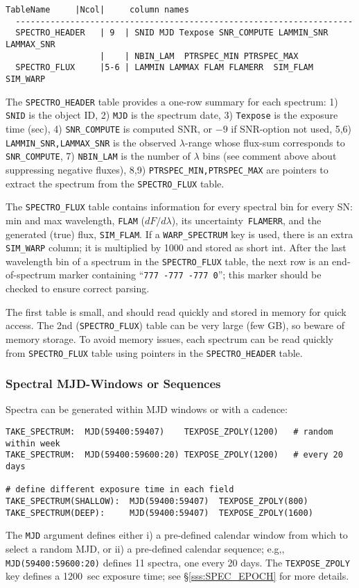\documentclass[12pt]{article}
\newcommand{\unc}{uncertainty}
\newcommand{\Flam}{dF/d\lambda}
\begin{document}
\begin{Verbatim}[frame=single]
     TableName     |Ncol|     column names 
  --------------------------------------------------------------------
  SPECTRO_HEADER   | 9  | SNID MJD Texpose SNR_COMPUTE LAMMIN_SNR LAMMAX_SNR
                   |    | NBIN_LAM  PTRSPEC_MIN PTRSPEC_MAX
  SPECTRO_FLUX     |5-6 | LAMMIN LAMMAX FLAM FLAMERR  SIM_FLAM  SIM_WARP
\end{Verbatim}
%
The {\tt SPECTRO\_HEADER} table provides a one-row summary for 
each spectrum:
1) {\tt SNID} is the object ID, 
2) {\tt MJD} is the spectrum date, 
3) {\tt Texpose}  is the exposure time (sec), 
4) {\tt SNR\_COMPUTE} is computed SNR, or $-9$ if SNR-option not used,
5,6) {\tt LAMMIN\_SNR,LAMMAX\_SNR} is the observed $\lambda$-range
  whose flux-sum corresponds to {\tt SNR\_COMPUTE},
7) {\tt NBIN\_LAM} is the number of $\lambda$ bins
(see comment above about suppressing negative fluxes), 
8,9) {\tt PTRSPEC\_MIN,PTRSPEC\_MAX} are  pointers to extract the 
spectrum from the {\tt SPECTRO\_FLUX} table.

The {\tt SPECTRO\_FLUX} table contains information for every spectral 
bin for every SN: 
min and max wavelength,
{\tt FLAM} ($\Flam$), 
its \unc\ {\tt FLAMERR}, 
and the generated (true) flux, {\tt SIM\_FLAM}.
If a {\tt WARP\_SPECTRUM} key is used, 
there is an extra {\tt SIM\_WARP} column;
it is multiplied by 1000 and stored as short int.
After the last wavelength bin of a spectrum in the {\tt SPECTRO\_FLUX}
table,  the next row is an end-of-spectrum marker containing
``{\tt 777  -777  -777  0}''; 
this marker should be checked to ensure correct parsing.

The first table is small, and should read quickly and 
stored in memory for quick access. The 2nd ({\tt SPECTRO\_FLUX}) 
table can be very large (few GB), so beware of memory storage.
To avoid memory issues, each spectrum can be read quickly
from {\tt SPECTRO\_FLUX} table using pointers in the 
{\tt SPECTRO\_HEADER} table.

\subsubsection{Spectral MJD-Windows or Sequences }
\label{sss:SPEC_MJD}

Spectra can be generated within MJD windows or with a cadence:
%
\begin{Verbatim}[frame=single]
TAKE_SPECTRUM:  MJD(59400:59407)    TEXPOSE_ZPOLY(1200)   # random within week
TAKE_SPECTRUM:  MJD(59400:59600:20) TEXPOSE_ZPOLY(1200)   # every 20 days

# define different exposure time in each field
TAKE_SPECTRUM(SHALLOW):  MJD(59400:59407)  TEXPOSE_ZPOLY(800) 
TAKE_SPECTRUM(DEEP):     MJD(59400:59407)  TEXPOSE_ZPOLY(1600) 
\end{Verbatim}
%
The {\tt MJD} argument defines either 
i) a pre-defined calendar window from which to select a random MJD, 
or 
ii) a pre-defined calendar sequence;
e.g,, {\tt MJD(59400:59600:20)} defines 11 spectra, one every 20 days.
The {\tt TEXPOSE\_ZPOLY} key defines a 1200~sec exposure time;
see \S\ref{sss:SPEC_EPOCH} for more details.
\end{document}
